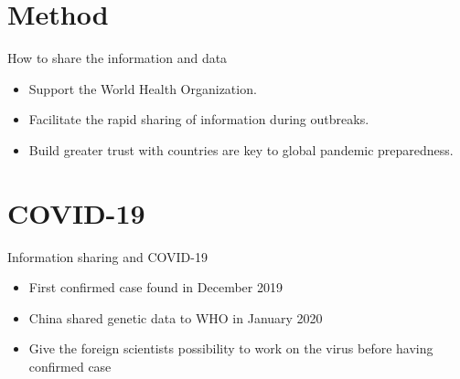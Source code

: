 \documentclass{beamer}
\begin{document}
\section{Method}
\begin{frame}{How to share the information and data}
\begin{itemize}

\item Support the World Health Organization.
\item Facilitate the rapid sharing of information during outbreaks.
\item Build greater trust with countries are key to global pandemic preparedness.
\citep{sciencedaily_2017}
\end{itemize}
\end{frame}


\section{COVID-19}
\begin{frame}{Information sharing and COVID-19}
\begin{itemize}

\item First confirmed case found in December 2019
\item China shared genetic data to WHO in January 2020
\item Give the foreign scientists possibility to work on the virus before having confirmed case
\citep{lisa}

\end{itemize}
\end{frame}
\end{document}
